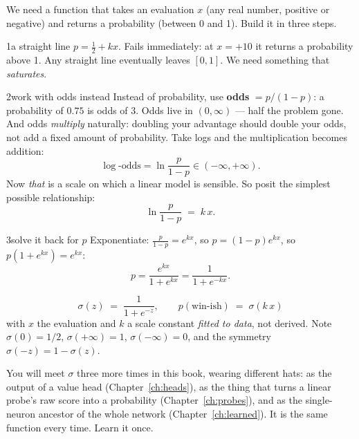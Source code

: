 We need a function that takes an evaluation $x$ (any real number, positive or negative) and
returns a probability (between 0 and 1). Build it in three steps.

\begin{attempt}{1}{a straight line}
$p = \tfrac12 + kx$. Fails immediately: at $x = +10$ it returns a probability above 1. Any
straight line eventually leaves $[0,1]$. We need something that \emph{saturates}.
\end{attempt}

\begin{attempt}{2}{work with odds instead}
Instead of probability, use \textbf{odds} $= p/(1-p)$: a probability of $0.75$ is odds of
$3$. Odds live in $(0,\infty)$ --- half the problem gone. And odds \emph{multiply} naturally:
doubling your advantage should double your odds, not add a fixed amount of probability.
Take logs and the multiplication becomes addition:
\[
\log\text{-odds} = \ln\frac{p}{1-p} \in (-\infty, +\infty).
\]
Now \emph{that} is a scale on which a linear model is sensible. So posit the simplest
possible relationship:
\[
\ln\frac{p}{1-p} \;=\; k\,x .
\]
\end{attempt}

\begin{attempt}{3}{solve it back for $p$}
Exponentiate: $\frac{p}{1-p} = e^{kx}$, so $p = (1-p)e^{kx}$, so $p(1 + e^{kx}) = e^{kx}$:
\[
p = \frac{e^{kx}}{1+e^{kx}} = \frac{1}{1+e^{-kx}} .
\]
\end{attempt}

\begin{finalform}
\begin{equation}
  \label{eq:logistic}
  \sigma(z) \;=\; \frac{1}{1+e^{-z}}, \qquad
  p(\text{win-ish}) \;=\; \sigma(k\,x)
\end{equation}
with $x$ the evaluation and $k$ a scale constant \emph{fitted to data}, not derived. Note
$\sigma(0) = 1/2$, $\sigma(+\infty) = 1$, $\sigma(-\infty) = 0$, and the symmetry
$\sigma(-z) = 1 - \sigma(z)$.
\end{finalform}

You will meet $\sigma$ three more times in this book, wearing different hats: as the output
of a value head (Chapter~\ref{ch:heads}), as the thing that turns a linear probe's raw score
into a probability (Chapter~\ref{ch:probes}), and as the single-neuron ancestor of the whole
network (Chapter~\ref{ch:learned}). It is the same function every time. Learn it once.

